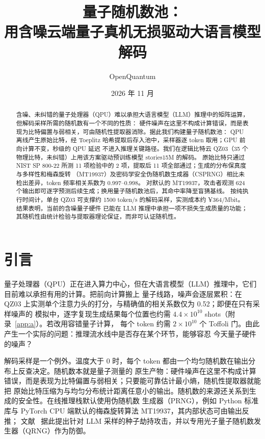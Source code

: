 \documentclass[11pt]{article}
\title{\sffamily\bfseries 量子随机数池：\\用含噪云端量子真机无损驱动大语言模型解码}
\author{OpenQuantum}
\date{2026 年 11 月}
\begin{document}
\maketitle

\begin{abstract}
\noindent
含噪、未纠错的量子处理器（QPU）难以承担大语言模型（LLM）推理中的矩阵运算，但解码采样所需的随机数有一个不同的性质：%
硬件噪声在这里不构成计算错误，而是表现为比特偏置与弱相关，可由随机性提取器消除。据此我们构建量子随机数池：
QPU 离线产生原始比特，经 Toeplitz 哈希提取后存入池中，采样器逐 token 取用；GPU 前向计算不变，秒级的 QPU 延迟%
不进入推理关键路径。我们在逻辑比特云 QZ03（35 个物理比特，未纠错）上用该方案驱动预训练模型 stories15M 的解码。%
原始比特只通过 NIST SP 800-22 所测 11 项检验中的 2 项，提取后 11 项全部通过；生成的分布保真度与多样性和梅森旋转%
（MT19937）及密码学安全伪随机数生成器（CSPRNG）相比未检出差异，token 频率相关系数为 0.997--0.998。%
对默认的 MT19937，攻击者观测 624 个输出即可逐字预测后续生成；换用量子随机数池后，其命中率降至盲猜基线。%
按纯执行时间计，单台 QZ03 可支撑约 1500 token/s 的解码采样，实测成本约 ¥364/Mbit。结果表明，当前的含噪量子硬件%
已能在 LLM 推理中承担一项不损失生成质量的功能；其随机性由统计检验与提取器理论保证，而非可认证随机性。
\end{abstract}

\section{引言}
量子处理器（QPU）正在进入算力中心，但在大语言模型（LLM）推理中，它们目前难以承担有用的计算。把前向计算搬上%
量子线路，噪声会逐层累积：在 QZ03 上实测单个注意力头的打分，与精确值的相关系数仅为 0.52；即便在只有采样噪声的%
模拟中，逐字复现生成结果每个位置也约需 $4.4\times10^{10}$ shots（附录~\ref{app:a}）。若改用容错量子计算，%
每个 token 约需 $2\times10^{10}$ 个 Toffoli 门。由此产生一个实际的问题：推理流水线中是否存在某个环节，能够容忍%
今天量子硬件的噪声？

解码采样是一个例外。温度大于 0 时，每个 token 都由一个均匀随机数在输出分布上反查决定。随机数本就是量子测量的%
原生产物：硬件噪声在这里不构成计算错误，而是表现为比特偏置与弱相关；只要能可靠估计最小熵，随机性提取器就能把%
原始比特压缩为与均匀分布统计距离任意小的输出。随机数的来源还关系到生成的安全性。在线推理栈默认使用伪随机数%
生成器（PRNG），例如 Python 标准库与 PyTorch CPU 端默认的梅森旋转算法 MT19937，其内部状态可由输出反推；%
文献~\cite{seedhijack} 据此提出针对 LLM 采样的种子劫持攻击，并以专用光子量子随机数发生器（QRNG）作为防御。
\end{document}

